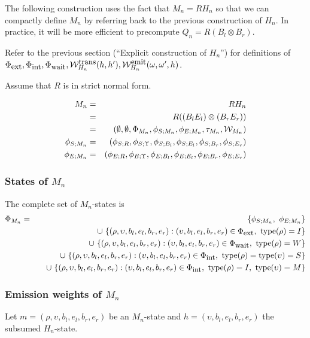 \documentclass{article}
\newcommand\compose{}
\newcommand\fork{\otimes}
\newcommand\idfork{\Upsilon}
\newcommand\States{\Phi}
\newcommand\statesof[1]{\States_{#1}}
\newcommand\Transitions{\tau}
\newcommand\transitionsof[1]{\Transitions_{#1}}
\newcommand\startstateof[1]{\phi_{S;#1}}
\newcommand\laststateof[1]{\phi_{E;#1}}
\newcommand\weight{{\cal W}}
\newcommand\weightfunof[1]{\weight_{#1}}
\newcommand\transweightfun[1]{\weightfunof{#1}^{\mbox{\small trans}}}
\newcommand\emitweightfun[1]{\weightfunof{#1}^{\mbox{\small emit}}}
\newcommand\statetype{\mbox{type}}
\newcommand\stateset[1]{\statesof{\mbox{\small #1}}}
\newcommand\hstate{(\upsilon,b_l,e_l,b_r,e_r)}
\newcommand\externalsuffix{ext}
\newcommand\internalsuffix{int}
\newcommand\waitsuffix{wait}
\newcommand\externalcascades{\stateset{\externalsuffix}}
\newcommand\internalcascades{\stateset{\internalsuffix}}
\newcommand\waitstates{\stateset{\waitsuffix}}
\newcommand\mstate{(\rho,\upsilon,b_l,e_l,b_r,e_r)}
\begin{document}
The following construction uses the fact that $M_n = R \compose H_n$ so that we can compactly define $M_n$ by referring back to the previous construction of $H_n$.
In practice, it will be more efficient to precompute $Q_n = R \compose (B_l \fork B_r)$.

Refer to the previous section (``Explicit construction of $H_n$'') for definitions of
$\externalcascades,\internalcascades,\waitstates,\transweightfun{H_n}(h,h'),\emitweightfun{H_n}(\omega,\omega',h)$.

Assume that $R$ is in strict normal form.

\begin{eqnarray*}
M_n & = & R \compose H_n \\
& = & R \compose ((B_l \compose E_l) \fork (B_r \compose E_r)) \\
& = & (\emptyset,\emptyset,\statesof{M_n},\startstateof{M_n},\laststateof{M_n},\transitionsof{M_n},\weightfunof{M_n}) \\
\startstateof{M_n} & = & (\startstateof{R},\startstateof{\idfork},\startstateof{B_l},\startstateof{E_l},\startstateof{B_r},\startstateof{E_r}) \\
\laststateof{M_n} & = & (\laststateof{R},\laststateof{\idfork},\laststateof{B_l},\laststateof{E_l},\laststateof{B_r},\laststateof{E_r})
\end{eqnarray*}

\subsubsection{States of $M_n$}
The complete set of $M_n$-states is
\begin{eqnarray*}
\statesof{M_n} & = & \{ \startstateof{M_n},\ \laststateof{M_n} \} \\
& & \quad \cup\ \{ \mstate: \hstate \in \externalcascades,\ \statetype(\rho)=I \} \\
& & \quad \cup\ \{ \mstate: \hstate \in \waitstates,\ \statetype(\rho)=W \} \\
& & \quad \cup\ \{ \mstate: \hstate \in \internalcascades,\ \statetype(\rho)=\statetype(\upsilon)=S \} \\
& & \quad \cup\ \{ \mstate: \hstate \in \internalcascades,\ \statetype(\rho)=I,\ \statetype(\upsilon)=M \}
\end{eqnarray*}

\subsubsection{Emission weights of $M_n$}
Let $m = \mstate$ be an $M_n$-state and $h = \hstate$ the subsumed $H_n$-state.
\end{document}
